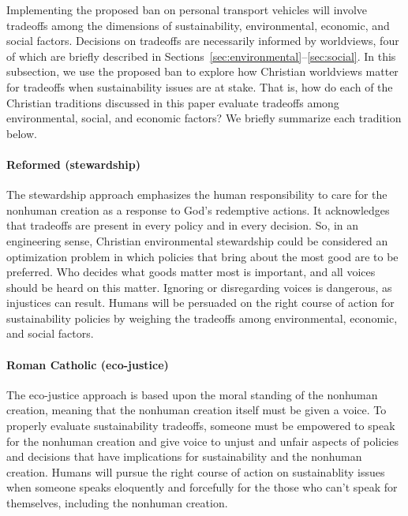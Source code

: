 \documentclass[12pt]{article}
\begin{document}
Implementing the proposed ban on personal transport vehicles
will involve tradeoffs among the dimensions of sustainability, 
environmental, economic, and social factors.
Decisions on tradeoffs are necessarily informed by worldviews,
four of which are briefly described 
in Sections~\ref{sec:environmental}--\ref{sec:social}.
In this subsection, 
we use the proposed ban to explore how Christian worldviews matter 
for tradeoffs when sustainability issues are at stake.
That is, how do each of the Christian traditions discussed in this paper 
evaluate tradeoffs among environmental, social, and economic factors?
We briefly summarize each tradition below.

\paragraph{Reformed (stewardship)} 

The stewardship approach emphasizes the human responsibility 
to care for the nonhuman creation
as a response to God's redemptive actions.
It acknowledges that tradeoffs 
are present in every policy and in every decision. 
So, in an engineering sense, 
Christian environmental stewardship could be considered an optimization problem
in which policies that bring about the most good 
are to be preferred.
Who decides what goods matter most is important, and 
all voices should be heard on this matter.
Ignoring or disregarding voices is dangerous,
as injustices can result. 
Humans will be persuaded on the right course of action
for sustainability policies by weighing the tradeoffs 
among environmental, economic, and social factors.

\paragraph{Roman Catholic (eco-justice)} 

The eco-justice approach is based upon the moral standing of the nonhuman creation,
meaning that the nonhuman creation itself must be given a voice. 
To properly evaluate sustainability tradeoffs,
someone must be empowered to speak for the nonhuman creation and 
give voice to unjust and unfair aspects of policies and decisions
that have implications for sustainability and the nonhuman creation.
Humans will pursue the right course of action on sustainablity issues
when someone speaks eloquently and forcefully for the 
those who can't speak for themselves, including the nonhuman creation. 
\end{document}
